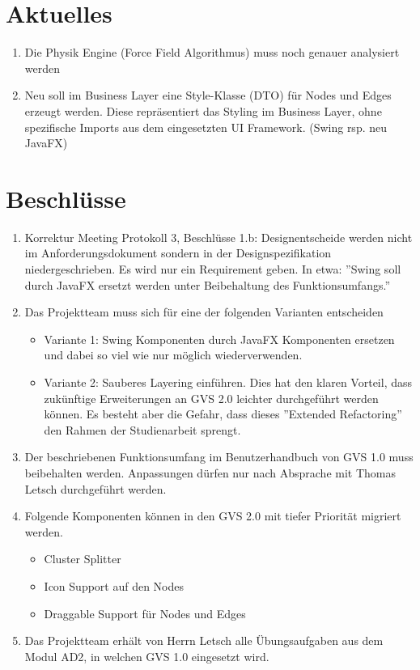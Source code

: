 \documentclass[11pt, a4paper,oneside]{scrartcl}
\begin{document}
\section{Aktuelles}
\begin{enumerate}
	\item Die Physik Engine (Force Field Algorithmus) muss noch genauer analysiert werden
	\item Neu soll im Business Layer eine Style-Klasse (DTO) für Nodes und Edges erzeugt werden. Diese repräsentiert das Styling im Business Layer, ohne spezifische Imports aus dem eingesetzten UI Framework. (Swing rsp. neu JavaFX)
\end{enumerate}

\section{Beschlüsse}
\begin{enumerate}
	\item Korrektur Meeting Protokoll 3, Beschlüsse 1.b: Designentscheide werden nicht im Anforderungsdokument sondern in der Designspezifikation niedergeschrieben. Es wird nur ein Requirement geben. In etwa: ''Swing soll durch JavaFX ersetzt werden unter Beibehaltung des Funktionsumfangs.''
	\item Das Projektteam muss sich für eine der folgenden Varianten entscheiden
	\begin{itemize}
		\item Variante 1: Swing Komponenten durch JavaFX Komponenten ersetzen und dabei so viel wie nur möglich wiederverwenden.
		\item Variante 2: Sauberes Layering einführen. Dies hat den klaren Vorteil, dass zukünftige Erweiterungen an GVS 2.0 leichter durchgeführt werden können. Es besteht aber die Gefahr, dass dieses ''Extended Refactoring'' den Rahmen der Studienarbeit sprengt.
	\end{itemize}
	\item Der beschriebenen Funktionsumfang im Benutzerhandbuch von GVS 1.0 muss beibehalten werden. Anpassungen dürfen nur nach Absprache mit Thomas Letsch durchgeführt werden.
	\item Folgende Komponenten können in den GVS 2.0 mit tiefer Priorität migriert werden.
	\begin{itemize}
		\item Cluster Splitter
		\item Icon Support auf den Nodes
		\item Draggable Support für Nodes und Edges
	\end{itemize}
	\item Das Projektteam erhält von Herrn Letsch alle Übungsaufgaben aus dem Modul AD2, in welchen GVS 1.0 eingesetzt wird.
\end{enumerate}
\end{document}

